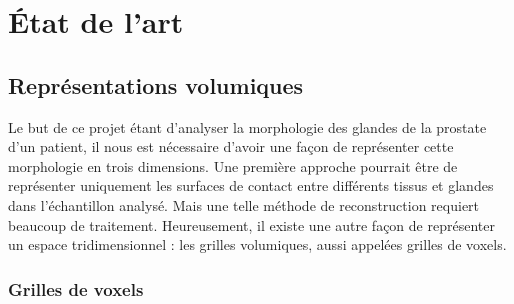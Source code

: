 \chapter{État de l'art}\label{chapter:02:stateoftheart}
{
	\par
	\par
	\par

	\section{Représentations volumiques}
	{
		Le but de ce projet étant d'analyser la morphologie des glandes de la prostate d'un patient, il nous est nécessaire d'avoir une façon de représenter cette morphologie en trois dimensions. Une première approche pourrait être de représenter uniquement les surfaces de contact entre différents tissus et glandes dans l'échantillon analysé. Mais une telle méthode de reconstruction requiert beaucoup de traitement. Heureusement, il existe une autre façon de représenter un espace tridimensionnel : les grilles volumiques, aussi appelées grilles de voxels.\par

		\subsection{Grilles de voxels}
		{
			\\

}}}
